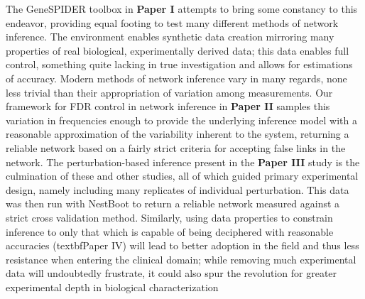 The GeneSPIDER toolbox in \textbf{Paper I} attempts to bring some constancy to this endeavor, providing equal footing to test many different methods of network inference. The environment enables synthetic data creation mirroring many properties of real biological, experimentally derived data; this data enables  full control, something quite lacking in true investigation and allows for estimations of accuracy. Modern methods of network inference vary in many regards, none less trivial than their appropriation of variation among measurements. Our framework for FDR control in network inference in \textbf{Paper II} samples this variation in frequencies enough to provide the underlying inference model  with a reasonable approximation of the variability inherent to the system, returning a reliable network based on a fairly strict criteria for accepting false links in the network. The perturbation-based inference present in the \textbf{Paper III} study is the culmination of these and other studies, all of which guided primary experimental design, namely including many replicates of individual perturbation. This data was then run with NestBoot to return a reliable network measured against a strict cross validation method. Similarly, using data properties to constrain inference to only that which is capable of being deciphered with reasonable accuracies (textbf{Paper IV}) will lead to better adoption in the field and thus less resistance when entering the clinical domain; while removing much experimental data will undoubtedly frustrate, it could also spur the revolution for greater experimental depth in biological characterization%
\\








